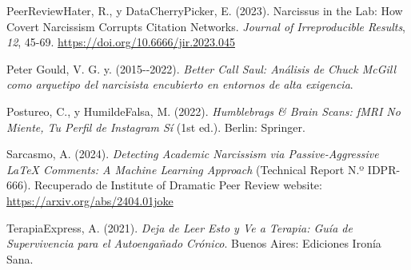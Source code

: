 \documentclass[
  10pt]{article}
\newlength{\cslhangindent}
\newenvironment{CSLReferences}[2] %
 {\begin{list}{}{%
  \setlength{\itemindent}{0pt}
  \setlength{\leftmargin}{0pt}
  \setlength{\parsep}{0pt}
  \ifodd #1
   \setlength{\leftmargin}{\cslhangindent}
   \setlength{\itemindent}{-1\cslhangindent}
  \fi
  \setlength{\itemsep}{#2\baselineskip}}}
 {\end{list}}
\begin{document}
\begin{CSLReferences}{1}{0}
PeerReviewHater, R., y DataCherryPicker, E. (2023). Narcissus in the
Lab: How Covert Narcissism Corrupts Citation Networks. \emph{Journal of
Irreproducible Results}, \emph{12}, 45-69.
\url{https://doi.org/10.6666/jir.2023.045}

Peter Gould, V. G. y. (2015-\/-2022). \emph{Better Call Saul: Análisis
de Chuck McGill como arquetipo del narcisista encubierto en entornos de
alta exigencia}.

Postureo, C., y HumildeFalsa, M. (2022). \emph{Humblebrags \& Brain
Scans: {fMRI} No Miente, Tu Perfil de Instagram Sí} (1st ed.). Berlin:
Springer.

Sarcasmo, A. (2024). \emph{Detecting Academic Narcissism via
Passive-Aggressive LaTeX Comments: A Machine Learning Approach}
(Technical Report N.º IDPR-666). Recuperado de Institute of Dramatic
Peer Review website: \url{https://arxiv.org/abs/2404.01joke}

TerapiaExpress, A. (2021). \emph{Deja de Leer Esto y Ve a Terapia: Guía
de Supervivencia para el Autoengañado Crónico}. Buenos Aires: Ediciones
Ironía Sana.

\end{CSLReferences}
\end{document}
